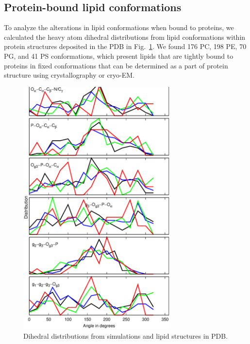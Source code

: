 \documentclass[aps,prl,superscriptaddress,twocolumn]{revtex4}
\begin{document}
\subsection{Protein-bound lipid conformations}

To analyze the alterations in lipid conformations when bound to proteins,
we calculated the heavy atom dihedral distributions from lipid conformations within protein structures deposited in the PDB \cite{berman00} in Fig.~\ref{dihedralsFROMpdb}.
We found 176 PC, 198 PE, 70 PG, and 41 PS conformations, which
present lipids that are tightly bound to proteins in fixed conformations
that can be determined as a part of protein structure using crystallography or cryo-EM. 


\begin{figure}[]
  \centering
  \includegraphics[width=8.0cm]{./Figs/DIHEDRALSALLfromPDB.eps}
  \caption{\label{dihedralsFROMpdb}
    Dihedral distributions from simulations and lipid structures in PDB.
  }
\end{figure}
\end{document}
